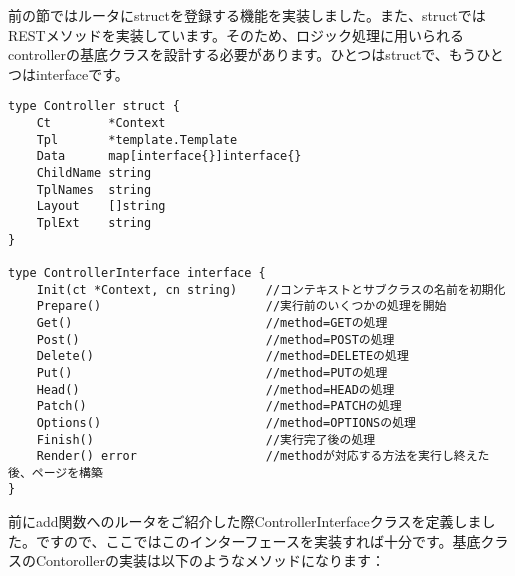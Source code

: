 前の節ではルータにstructを登録する機能を実装しました。また、structではRESTメソッドを実装しています。そのため、ロジック処理に用いられるcontrollerの基底クラスを設計する必要があります。ひとつはstructで、もうひとつはinterfaceです。

\begin{lstlisting}[numbers=none]
type Controller struct {
    Ct        *Context
    Tpl       *template.Template
    Data      map[interface{}]interface{}
    ChildName string
    TplNames  string
    Layout    []string
    TplExt    string
}

type ControllerInterface interface {
    Init(ct *Context, cn string)    //コンテキストとサブクラスの名前を初期化
    Prepare()                       //実行前のいくつかの処理を開始
    Get()                           //method=GETの処理
    Post()                          //method=POSTの処理
    Delete()                        //method=DELETEの処理
    Put()                           //method=PUTの処理
    Head()                          //method=HEADの処理
    Patch()                         //method=PATCHの処理
    Options()                       //method=OPTIONSの処理
    Finish()                        //実行完了後の処理
    Render() error                  //methodが対応する方法を実行し終えた後、ページを構築
}
\end{lstlisting}

前にadd関数へのルータをご紹介した際ControllerInterfaceクラスを定義しました。ですので、ここではこのインターフェースを実装すれば十分です。基底クラスのContorollerの実装は以下のようなメソッドになります：

